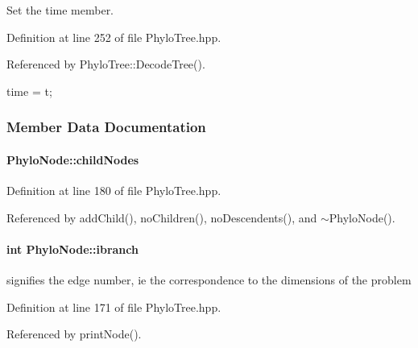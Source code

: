 \-Set the time member. 



\-Definition at line 252 of file \-Phylo\-Tree.\-hpp.



\-Referenced by \-Phylo\-Tree\-::\-Decode\-Tree().


\begin{DoxyCode}
    {
      time = t;
    }
\end{DoxyCode}


\subsubsection{\-Member \-Data \-Documentation}
\hypertarget{classPhyloNode_ae90d7dd10164a001107371397dc036be}{
\paragraph[{child\-Nodes}]{ {\bf \-Phylo\-Node\-::child\-Nodes}}}\label{classPhyloNode_ae90d7dd10164a001107371397dc036be}


\-Definition at line 180 of file \-Phylo\-Tree.\-hpp.



\-Referenced by add\-Child(), no\-Children(), no\-Descendents(), and $\sim$\-Phylo\-Node().

\hypertarget{classPhyloNode_a08d47840fd629726502a4c83ee7f97d0}{
\paragraph[{ibranch}]{\setlength{\rightskip}{0pt plus 5cm}int {\bf \-Phylo\-Node\-::ibranch}}}\label{classPhyloNode_a08d47840fd629726502a4c83ee7f97d0}


signifies the edge number, ie the correspondence to the dimensions of the problem 



\-Definition at line 171 of file \-Phylo\-Tree.\-hpp.



\-Referenced by print\-Node().

